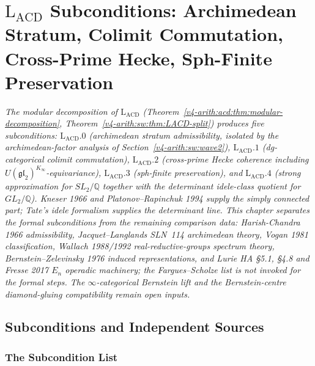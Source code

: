 \chapter{\(\mathrm{L}_{\mathrm{ACD}}\) Subconditions: Archimedean Stratum, Colimit Commutation, Cross-Prime Hecke, Sph-Finite Preservation}
\label{v4-arith:lacd-sub}

\emph{The modular decomposition of \(\mathrm{L}_{\mathrm{ACD}}\)
(Theorem~\ref{v4-arith:acd:thm:modular-decomposition},
Theorem~\ref{v4-arith:sw:thm:LACD-split}) produces five subconditions:
\(\mathrm{L}_{\mathrm{ACD}}.0\) (archimedean stratum admissibility,
isolated by the archimedean-factor analysis of
Section~\ref{v4-arith:sw:wave2}),
\(\mathrm{L}_{\mathrm{ACD}}.1\) (dg-categorical colimit commutation),
\(\mathrm{L}_{\mathrm{ACD}}.2\) (cross-prime Hecke coherence
including \(U(\mathfrak{gl}_{2})^{K_{\infty}}\)-equivariance),
\(\mathrm{L}_{\mathrm{ACD}}.3\) (sph-finite preservation), and
\(\mathrm{L}_{\mathrm{ACD}}.4\) (strong approximation for
\(SL_{2}/\mathbb{Q}\) together with the determinant idele-class
quotient for \(GL_{2}/\mathbb{Q}\)). Kneser 1966 and
Platonov--Rapinchuk 1994 supply the simply connected part; Tate's
idele formalism supplies the determinant line. This chapter separates the formal
subconditions from the remaining comparison data: Harish-Chandra 1966
admissibility, Jacquet--Langlands SLN~114 archimedean theory, Vogan
1981 classification, Wallach 1988/1992 real-reductive-groups spectrum
theory, Bernstein--Zelevinsky 1976 induced representations, and
Lurie HA \S5.1, \S4.8 and Fresse 2017 \(E_{n}\) operadic machinery;
the Fargues--Scholze list is not invoked for the formal steps.
The \(\infty\)-categorical Bernstein lift and the Bernstein-centre
diamond-gluing compatibility remain open inputs.}

\section{Subconditions and Independent Sources}
\label{v4-arith:lacd:context}

\subsection{The Subcondition List}


